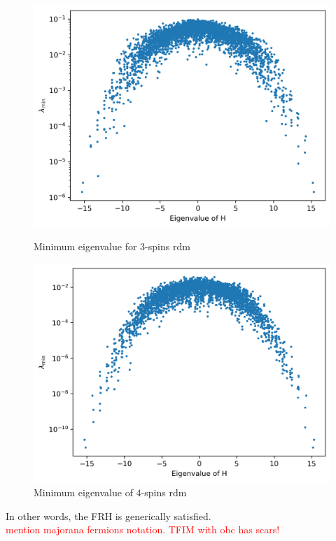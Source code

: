 \documentclass{article}
\begin{document}
\begin{figure}[h!]
  \centering
  \begin{minipage}[b]{0.45\textwidth}
    \centering
    \includegraphics[width=\textwidth]{TFIM_pbc_3spins.png}
    \caption{Minimum eigenvalue for $3$-spins rdm}
  \end{minipage}
  \hfill
  \begin{minipage}[b]{0.45\textwidth}
    \centering
    \includegraphics[width=\textwidth]{TFIM_pbc_4spins.png}
    \caption{Minimum eigenvalue of $4$-spins rdm}
  \end{minipage}
  \label{fig:minipage-images}
\end{figure}


In other words, the FRH is generically satisfied.\\
\textcolor{red}{mention majorana fermions notation. TFIM with obc has scars!}
\end{document}
